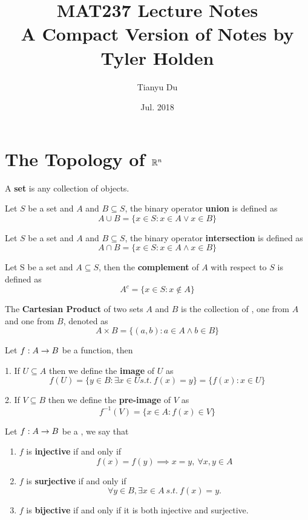 \documentclass{article}
\author{Tianyu Du}
\title{MAT237 Lecture Notes \\ \small A Compact Version of Notes by Tyler Holden}
\date{Jul. 2018}
\begin{document}
	\maketitle
	\tableofcontents
	
	\section{The Topology of $\mathbb{R} ^n$}
	
	\begin{definition}
		A \textbf{set} is any collection of  objects.
	\end{definition}
	
	\begin{definition}
		Let $S$ be a set and $A$ and $B \subseteq S$, the binary operator \textbf{union} is defined as
		\[
			A \cup B = \{x \in S: x \in A \lor x \in B \}
		\]
	\end{definition}
	
	\begin{definition}
		Let $S$ be a set and $A$ and $B \subseteq S$, the binary operator \textbf{intersection} is defined as
		\[
			A \cap B = \{x \in S: x \in A \land x \in B \}
		\]
	\end{definition}
	
	\begin{definition}
		Let S be a set and $A \subseteq S$, then the \textbf{complement} of $A$ with respect to $S$ is defined as
		\[
			A^c = \{x \in S: x \notin A\}
		\] 
	\end{definition}
	
	\begin{definition}
		The \textbf{Cartesian Product} of two sets $A$ and $B$ is the collection of , one from $A$ and one from $B$, denoted as 
		\[
			A \times B = \{(a, b): a \in A \land b \in B \}
		\]	
	\end{definition}
	
	\begin{definition}
		Let ${f}: {A} \to {B}$ be a function, then
		
		1. If $U \subseteq A$ then we define the \textbf{image} of $U$ as
			\[
				f(U) = \{y \in B: \exists x \in U s.t.\ f(x) = y \} = \{f(x): x\in U\}
			\] 
		
		2. If $V \subseteq B$ then we define the \textbf{pre-image} of $V$ as 
			\[
				f^{-1}(V) = \{x \in A: f(x) \in V\}
			\]
	\end{definition}

	\begin{definition}
		Let ${f}: {A} \to {B}$ be a , we say that
		\begin{enumerate}
			\item $f$ is \textbf{injective} if and only if
				\[
					f(x) = f(y) \implies x = y,\ \forall x, y \in A
				\]
			\item $f$ is \textbf{surjective} if and only if
				\[
					\forall y \in B, \exists x \in A \  s.t.\ f(x) = y.
				\]
			\item $f$ is \textbf{bijective} if and only if it is both injective and surjective.
		\end{enumerate}
	\end{definition}
	
\end{document}
